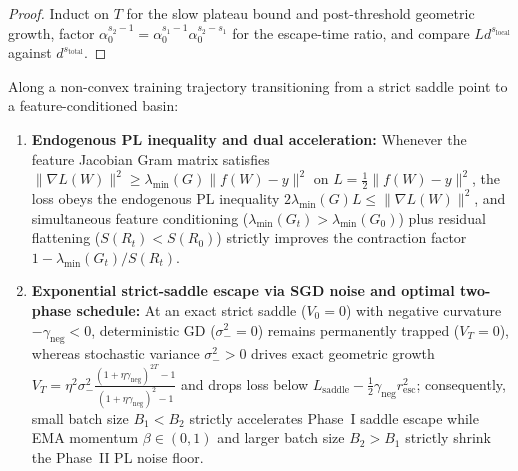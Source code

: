 \begin{proof}
\leanok
Induct on $T$ for the slow plateau bound and post-threshold geometric growth, factor $\alpha_0^{s_2-1} = \alpha_0^{s_1-1}\alpha_0^{s_2-s_1}$ for the escape-time ratio, and compare $L d^{s_{\mathrm{local}}}$ against $d^{s_{\mathrm{total}}}$.
\end{proof}

\begin{lemma}\label{lem:global_saddle_pl}
\leanok
{}
Along a non-convex training trajectory transitioning from a strict saddle point to a feature-conditioned basin:
\begin{enumerate}
\item \textbf{Endogenous PL inequality and dual acceleration:} Whenever the feature Jacobian Gram matrix satisfies $\|\nabla L(W)\|^2 \ge \lambda_{\min}(G)\|f(W)-y\|^2$ on $L = \frac{1}{2}\|f(W)-y\|^2$, the loss obeys the endogenous PL inequality $2\lambda_{\min}(G)L \le \|\nabla L(W)\|^2$, and simultaneous feature conditioning ($\lambda_{\min}(G_t) > \lambda_{\min}(G_0)$) plus residual flattening ($S(R_t) < S(R_0)$) strictly improves the contraction factor $1 - \lambda_{\min}(G_t)/S(R_t)$.
\item \textbf{Exponential strict-saddle escape via SGD noise and optimal two-phase schedule:} At an exact strict saddle ($V_0 = 0$) with negative curvature $-\gamma_{\mathrm{neg}} < 0$, deterministic GD ($\sigma_-^2 = 0$) remains permanently trapped ($V_T = 0$), whereas stochastic variance $\sigma_-^2 > 0$ drives exact geometric growth $V_T = \eta^2\sigma_-^2\frac{(1+\eta\gamma_{\mathrm{neg}})^{2T}-1}{(1+\eta\gamma_{\mathrm{neg}})^2-1}$ and drops loss below $L_{\mathrm{saddle}} - \frac{1}{2}\gamma_{\mathrm{neg}}r_{\mathrm{esc}}^2$; consequently, small batch size $B_1 < B_2$ strictly accelerates Phase~I saddle escape while EMA momentum $\beta\in(0,1)$ and larger batch size $B_2 > B_1$ strictly shrink the Phase~II PL noise floor.
\end{enumerate}
\end{lemma}
